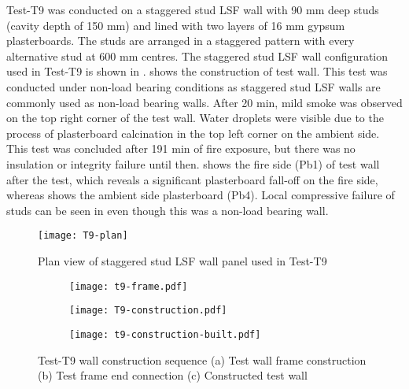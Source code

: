 Test-T9 was conducted on a staggered stud LSF wall with 90 mm deep studs (cavity depth of 150 mm) and lined with two layers of 16 mm gypsum plasterboards. The studs are arranged in a staggered pattern with every alternative stud at 600 mm centres. The staggered stud LSF wall configuration used in Test-T9 is shown in .  shows the construction of test wall. This test was conducted under non-load bearing conditions as staggered stud LSF walls are commonly used as non-load bearing walls. After 20 min, mild smoke was observed on the top right corner of the test wall. Water droplets were visible due to the process of plasterboard calcination in the top left corner on the ambient side. This test was concluded after 191 min of fire exposure, but there was no insulation or integrity failure until then.  shows the fire side (Pb1) of test wall after the test, which reveals a significant plasterboard fall-off on the fire side, whereas  shows the ambient side plasterboard (Pb4). Local compressive failure of studs can be seen in  even though this was a non-load bearing wall.   
\begin{figure}[!htbp]
	\centering
		\texttt{[image: T9-plan]}
		\caption{Plan view of staggered stud LSF wall panel used in Test-T9}
		\label{fig:T9-plan}
\end{figure}
\begin{figure}[!htbp]
	\centering
	\begin{subfigure}[b]{0.45\textwidth}
		\centering
		\texttt{[image: t9-frame.pdf]}
		\caption{}
		\label{subfig:t9-frame}
	\end{subfigure}
	\begin{subfigure}[b]{0.45\textwidth}
		\centering
		\texttt{[image: T9-construction.pdf]}
		\caption{}
		\label{subfig:T9-construction}
	\end{subfigure}
	\begin{subfigure}[b]{0.45\textwidth}
		\centering
		\texttt{[image: t9-construction-built.pdf]}
		\caption{}
		\label{subfig:t9-construction-built}
	\end{subfigure}
	   \caption{Test-T9 wall construction sequence (a) Test wall frame construction (b) Test frame end connection (c) Constructed test wall }
	   \label{fig:t9-construction-sequence}
\end{figure}
